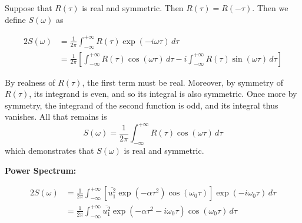 \documentclass[a4paper]{article}
\begin{document}

Suppose that \(R \!\left( \tau  \right) \) is real and symmetric. Then \(R \!\left( \tau  \right) = R \!\left( -\tau  \right) \). Then we define \(S \!\left( \omega  \right) \) as

\begin{alignat*}{2}
	S \!\left( \omega  \right) & = \frac{1}{2 \pi } \int^{+\infty}_{-\infty} R \!\left( \tau  \right) \exp\left( -i \omega \tau  \right) \, d \tau \\
	& = \frac{1}{2 \pi } \!\left[ \int^{+\infty}_{-\infty} R \!\left( \tau  \right) \cos\left( \omega \tau  \right) \, d \tau - i \int^{+\infty}_{-\infty} R \!\left( \tau  \right) \sin\left( \omega \tau  \right) \, d \tau    \right] 
\end{alignat*}

By realness of \(R \!\left( \tau  \right) \), the first term must be real. Moreover, by symmetry of \(R \!\left( \tau  \right) \), its integrand is even, and so its integral is also symmetric. Once more by symmetry, the integrand of the second function is odd, and its integral thus vanishes. All that remains is
\[
	S \!\left( \omega  \right) = \frac{1}{2 \pi } \int^{+\infty}_{-\infty} R \!\left( \tau  \right) \cos\left( \omega \tau  \right) \, d \tau  
\]
which demonstrates that \(S \!\left( \omega  \right) \) is real and symmetric.

\vspace{12pt}


\textbf{Power Spectrum:}

\begin{alignat*}{2}
	S \!\left( \omega  \right)  & = \frac{1}{2 \pi } \int^{+\infty}_{-\infty} \!\left[ \overline{u^{2}_{1}} \exp\left( -\alpha \tau^{2} \right) \cos\left( \omega_{0}\tau  \right) \right] \exp\left( -i \omega_{0} \tau  \right) \, d \tau   \\
	 & = \frac{1}{2 \pi } \int^{+\infty}_{-\infty} \overline{u^{2}_{1}} \exp\left( -\alpha \tau^{2} - i \omega_{0} \tau  \right) \cos\left( \omega_{0}\tau  \right) \, d \tau   \\ 
\end{alignat*}
\end{document}
